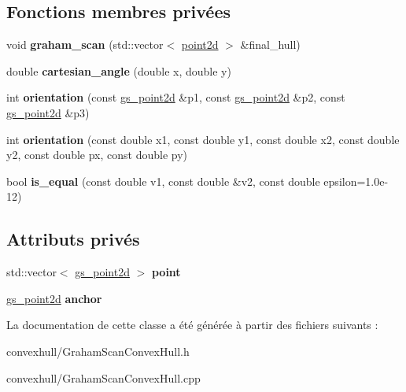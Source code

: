 \subsection*{Fonctions membres privées}
\begin{DoxyCompactItemize}
\item 
\hypertarget{class_graham_scan_convex_hull_a393f7c83b7ffaef74c0970036b39578f}{void {\bfseries graham\-\_\-scan} (std\-::vector$<$ \hyperlink{structpoint2d}{point2d} $>$ \&final\-\_\-hull)}\label{class_graham_scan_convex_hull_a393f7c83b7ffaef74c0970036b39578f}

\item 
\hypertarget{class_graham_scan_convex_hull_ad965b00815fcfc087e6cf106bd93233f}{double {\bfseries cartesian\-\_\-angle} (double x, double y)}\label{class_graham_scan_convex_hull_ad965b00815fcfc087e6cf106bd93233f}

\item 
\hypertarget{class_graham_scan_convex_hull_a2b902769a85bb2dca1c255a9e11d5d47}{int {\bfseries orientation} (const \hyperlink{structgs__point2d}{gs\-\_\-point2d} \&p1, const \hyperlink{structgs__point2d}{gs\-\_\-point2d} \&p2, const \hyperlink{structgs__point2d}{gs\-\_\-point2d} \&p3)}\label{class_graham_scan_convex_hull_a2b902769a85bb2dca1c255a9e11d5d47}

\item 
\hypertarget{class_graham_scan_convex_hull_a6e3d1ea31abfc06bd47cc6feec394ecf}{int {\bfseries orientation} (const double x1, const double y1, const double x2, const double y2, const double px, const double py)}\label{class_graham_scan_convex_hull_a6e3d1ea31abfc06bd47cc6feec394ecf}

\item 
\hypertarget{class_graham_scan_convex_hull_a4eedb7210a8deea74ea028c33e08a9f8}{bool {\bfseries is\-\_\-equal} (const double v1, const double \&v2, const double epsilon=1.\-0e-\/12)}\label{class_graham_scan_convex_hull_a4eedb7210a8deea74ea028c33e08a9f8}

\end{DoxyCompactItemize}
\subsection*{Attributs privés}
\begin{DoxyCompactItemize}
\item 
\hypertarget{class_graham_scan_convex_hull_ab3176ef5d56ec8cae729676f4499dfaa}{std\-::vector$<$ \hyperlink{structgs__point2d}{gs\-\_\-point2d} $>$ {\bfseries point}}\label{class_graham_scan_convex_hull_ab3176ef5d56ec8cae729676f4499dfaa}

\item 
\hypertarget{class_graham_scan_convex_hull_ab2985c5e94ee951d00283af98b8ea6f0}{\hyperlink{structgs__point2d}{gs\-\_\-point2d} {\bfseries anchor}}\label{class_graham_scan_convex_hull_ab2985c5e94ee951d00283af98b8ea6f0}

\end{DoxyCompactItemize}


La documentation de cette classe a été générée à partir des fichiers suivants \-:\begin{DoxyCompactItemize}
\item 
convexhull/Graham\-Scan\-Convex\-Hull.\-h\item 
convexhull/Graham\-Scan\-Convex\-Hull.\-cpp\end{DoxyCompactItemize}
